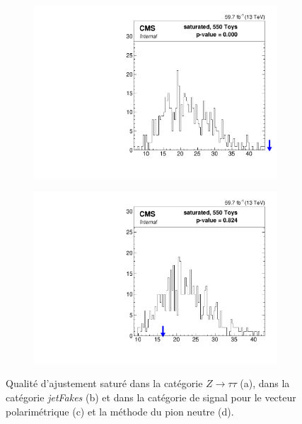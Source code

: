 \begin{figure}
\begin{subfigure}[b]{0.5\linewidth}
        \includegraphics[scale=0.35]{Chapitre7/Images/htt_mt_3_2018-saturated.pdf} 
        \caption{} 
        \vspace{0.5ex}
    \end{subfigure}
    \begin{subfigure}[b]{0.5\linewidth}
        \centering
        \includegraphics[scale=0.35]{Chapitre7/Images/htt_mt_4_2018-saturated.pdf} 
        \caption{} 
        \vspace{0.5ex}
    \end{subfigure}
    \caption{Qualité d'ajustement saturé dans la catégorie $Z\rightarrow\tau\tau$ (a), dans la catégorie \textit{jetFakes} (b) et dans la catégorie de signal pour le vecteur polarimétrique (c) et la méthode du pion neutre (d).}
    \label{BDTscores}
\end{figure}


